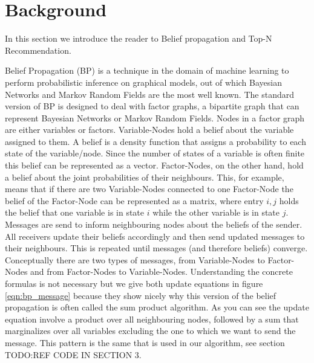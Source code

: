 \section{Background}\label{sec:background}

In this section we introduce the reader to Belief propagation and Top-N Recommendation.

Belief Propagation (BP) is a technique in the domain of machine learning to perform probabilistic inference on graphical models, out of which Bayesian Networks and Markov Random Fields are the most well known. The standard version of BP is designed to deal with factor graphs, a bipartite graph that can represent Bayesian Networks or Markov Random Fields. Nodes in a factor graph are either variables or factors. Variable-Nodes hold a belief about the variable assigned to them. A belief is a density function that assigns a probability to each state of the variable/node. Since the number of states of a variable is often finite this belief can be represented as a vector. Factor-Nodes, on the other hand, hold a belief about the joint probabilities of their neighbours. This, for example, means that if there are two Variable-Nodes connected to one Factor-Node the belief of the Factor-Node can be represented as a matrix, where entry $i,j$ holds the belief that one variable is in state $i$ while the other variable is in state $j$. Messages are send to inform neighbouring nodes about the beliefs of the sender. All receivers update their beliefs accordingly and then send updated messages to their neighbours. This is repeated until messages (and therefore beliefs) converge. Conceptually there are two types of messages, from Variable-Nodes to Factor-Nodes and from Factor-Nodes to Variable-Nodes. Understanding the concrete formulas is not necessary but we give both update equations in figure \ref{eqn:bp_message} because they show nicely why this version of the belief propagation is often called the sum product algorithm. As you can see the update equation involve a product over all neighbouring nodes, followed by a sum that marginalizes over all variables excluding the one to which we want to send the message. This pattern is the same that is used in our algorithm, see section TODO:REF CODE IN SECTION 3.

